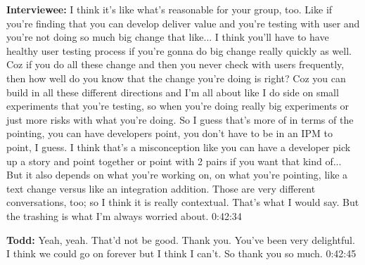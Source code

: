 \textbf{Interviewee:} I think it's like what's reasonable for your group, too. Like if you're finding that you can develop deliver value and you're testing with user and you're not doing so much big change that like...  I think you'll have to have healthy user testing process if you're gonna do big change really quickly as well.  Coz if you do all these change and then you never check with users frequently, then how well do you know that the change you're doing is right? Coz you can build in all these different directions and I'm all about like I do side on small experiments that you're testing, so when you're doing really big experiments or just more risks with what you're doing.   So I guess that's more of in terms of the pointing, you can have developers point, you don't have to be in an IPM to point, I guess.  I think that's a misconception like you can have a developer pick up a story and point together or point with 2 pairs if you want that kind of...  But it also depends on what you're working on, on what you're pointing, like a text change versus like an integration addition.  Those are very different conversations, too; so I think it is really contextual. That's what I would say.  But the trashing is what I'm always worried about.   0:42:34

\textbf{Todd:} Yeah, yeah.  That'd not be good.  Thank you.  You've been very delightful.  I think we could go on forever but I think I can't. So thank you so much.   0:42:45
